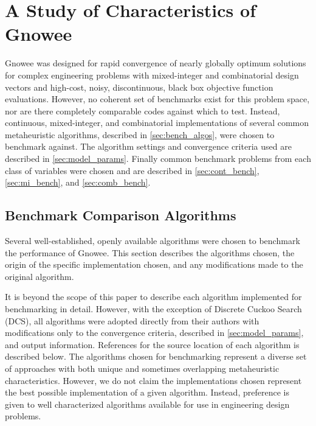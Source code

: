 \documentclass{article}                                                                           %
\begin{document}
\section{A Study of Characteristics of Gnowee} \label{sec:set-up}
Gnowee was designed for rapid convergence of nearly globally optimum solutions for complex engineering problems with mixed-integer and combinatorial design vectors and high-cost, noisy, discontinuous, black box objective function evaluations.  
However, no coherent set of benchmarks exist for this problem space, nor are there completely comparable codes against which to test.
Instead, continuous, mixed-integer, and combinatorial implementations of several common metaheuristic algorithms, described in \autoref{sec:bench_algos}, were chosen to benchmark against.
The algorithm settings and convergence criteria used are described in \autoref{sec:model_params}.
Finally common benchmark problems from each class of variables were chosen and are described in \autoref{sec:cont_bench}, \autoref{sec:mi_bench}, and \autoref{sec:comb_bench}.

\subsection{Benchmark Comparison Algorithms} \label{sec:bench_algos}
Several well-established, openly available algorithms were chosen to benchmark the performance of Gnowee.  
This section describes the algorithms chosen, the origin of the specific implementation chosen, and any modifications made to the original algorithm.  

It is beyond the scope of this paper to describe each algorithm implemented for benchmarking in detail.
However, with the exception of Discrete Cuckoo Search (DCS), all algorithms were adopted directly from their authors with modifications only to the convergence criteria, described in \autoref{sec:model_params}, and output information.  
References for the source location of each algorithm is described below.
The algorithms chosen for benchmarking represent a diverse set of approaches with both unique and sometimes overlapping metaheuristic characteristics.  
However, we do not claim the implementations chosen represent the best possible implementation of a given algorithm.  
Instead, preference is given to well characterized algorithms available for use in engineering design problems.
 
\end{document}
